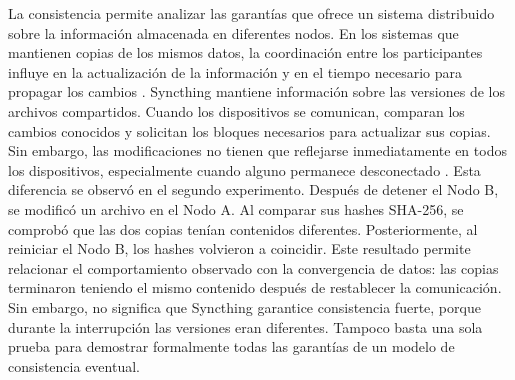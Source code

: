 \documentclass[12pt,a4paper]{article}
\begin{document}
La consistencia permite analizar las garantías que ofrece un sistema distribuido sobre la información almacenada en diferentes nodos. En los sistemas que mantienen copias de los mismos datos, 
la coordinación entre los participantes influye en la actualización de la información y en el tiempo necesario para propagar los cambios \cite{ahmed2023,lee2023}.
Syncthing mantiene información sobre las versiones de los archivos compartidos. Cuando los dispositivos se comunican, comparan los cambios conocidos y 
solicitan los bloques necesarios para actualizar sus copias. Sin embargo, las modificaciones no tienen que reflejarse inmediatamente en todos los dispositivos, especialmente cuando alguno permanece desconectado \cite{syncthingSyncing,syncthingBEP}.
Esta diferencia se observó en el segundo experimento. Después de detener el Nodo B, se modificó un archivo en el Nodo A. Al comparar sus hashes SHA-256, se comprobó que las dos copias tenían contenidos 
diferentes. Posteriormente, al reiniciar el Nodo B, los hashes volvieron a coincidir.
Este resultado permite relacionar el comportamiento observado con la convergencia de 
datos: las copias terminaron teniendo el mismo contenido después de restablecer la comunicación. Sin embargo, no significa que Syncthing garantice consistencia fuerte, porque durante la interrupción las versiones eran diferentes. Tampoco basta una sola prueba para demostrar formalmente todas las garantías de un modelo de consistencia eventual.
\end{document}

